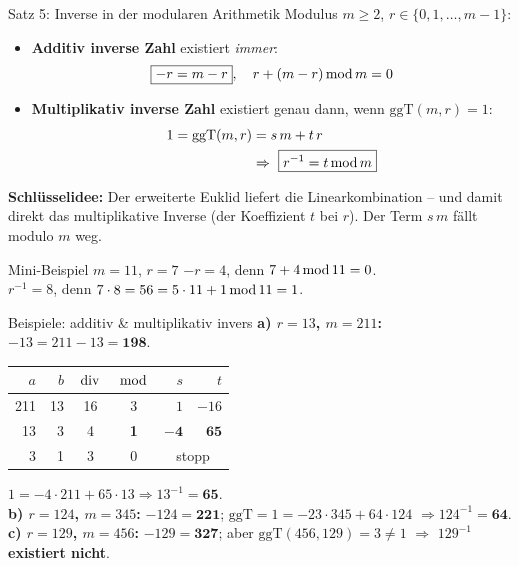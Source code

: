 \documentclass[a4paper, fontsize=7pt]{scrartcl}
\newcommand{\Div}{\mskip3mu\mathrm{div}\mskip3mu}
\newcommand{\Mod}{\mskip3mu\mathrm{mod}\mskip3mu}
\renewcommand*{\arraystretch}{1.5}  %
\begin{document}
\begin{mainbox}{Satz 5: Inverse in der modularen Arithmetik}
Modulus $m \ge 2$, $r \in \{0,1,\ldots,m-1\}$:
\begin{itemize}
    \item \textbf{Additiv inverse Zahl} existiert \emph{immer}:
          $$\boxed{-r = m - r}, \quad r + (m-r) \Mod m = 0$$
    \item \textbf{Multiplikativ inverse Zahl} existiert genau dann, wenn
          $\mathrm{ggT}(m,r) = 1$:
          \begin{align*}
          1 = \mathrm{ggT}(m,r) &= s\,m + t\,r\\
           &\Rightarrow\ \boxed{r^{-1} = t \Mod m}
          \end{align*}
\end{itemize}
\textbf{Schlüsselidee:} Der erweiterte Euklid liefert die Linearkombination
-- und damit direkt das multiplikative Inverse (der Koeffizient $t$ bei
$r$). Der Term $s\,m$ fällt modulo $m$ weg.
\end{mainbox}

\begin{subbox}{Mini-Beispiel $m=11$, $r=7$}
$-r = 4$, denn $7 + 4 \Mod 11 = 0$.\\
$r^{-1} = 8$, denn $7 \cdot 8 = 56 = 5 \cdot 11 + 1 \Mod 11 = 1$.
\end{subbox}

\begin{subbox}{Beispiele: additiv \& multiplikativ invers}
\textbf{a) $r = 13$, $m = 211$:} $-13 = 211-13 = \mathbf{198}$.
\renewcommand*{\arraystretch}{1.1}
\begin{center}
\setlength{\tabcolsep}{4pt}
\begin{tabular}{@{}rr|cc|rr@{}}
$a$ & $b$ & $\Div$ & $\Mod$ & $s$ & $t$ \\ \hline
211 & 13 & 16 & 3 & $1$ & $-16$ \\
13 & 3 & 4 & \textbf{1} & $\mathbf{-4}$ & $\mathbf{65}$ \\
3 & 1 & 3 & 0 & \multicolumn{2}{c}{stopp} \\
\end{tabular}
\end{center}
$1 = -4\cdot 211 + 65 \cdot 13 \Rightarrow 13^{-1} = \mathbf{65}$.\\[3pt]
\textbf{b) $r = 124$, $m = 345$:} $-124 = \mathbf{221}$;
$\mathrm{ggT} = 1 = -23 \cdot 345 + 64 \cdot 124$
$\Rightarrow 124^{-1} = \mathbf{64}$.\\[3pt]
\textbf{c) $r = 129$, $m = 456$:} $-129 = \mathbf{327}$; aber
$\mathrm{ggT}(456,129) = 3 \neq 1$ $\Rightarrow$ $129^{-1}$
\textbf{existiert nicht}.
\end{subbox}
\end{document}
